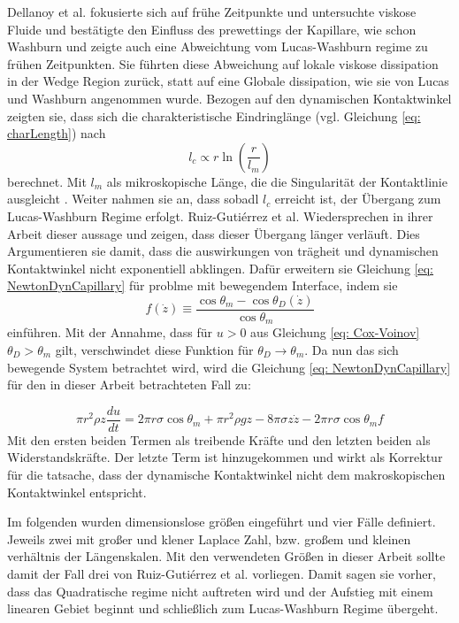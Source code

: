 Dellanoy et al. \cite{delannoy2019DualRoleViscosity} fokusierte sich auf frühe Zeitpunkte und untersuchte viskose Fluide und bestätigte den Einfluss des prewettings der Kapillare, wie schon Washburn \cite{washburn1921DynamicsCapillaryFlow} und zeigte auch eine Abweichtung vom Lucas-Washburn regime zu frühen Zeitpunkten. Sie führten diese Abweichung auf lokale viskose dissipation in der Wedge Region zurück, statt auf eine Globale dissipation, wie sie von Lucas und Washburn angenommen wurde. Bezogen auf den dynamischen Kontaktwinkel zeigten sie, dass sich die charakteristische Eindringlänge (vgl. Gleichung \ref{eq: charLength}) nach 
\begin{equation}
    l_c \propto r \ln\left(\frac{r}{l_m}\right)
\end{equation}
berechnet. Mit $l_m$ als mikroskopische Länge, die die Singularität der Kontaktlinie ausgleicht \cite{cox1986DynamicsSpreadingLiquids}. Weiter nahmen sie an, dass sobadl $l_c$ erreicht ist, der Übergang zum Lucas-Washburn Regime erfolgt.
Ruiz-Gutiérrez et al. \cite{ruiz-gutierrez2022LongCrossoverDynamics} Wiedersprechen in ihrer Arbeit dieser aussage und zeigen, dass dieser Übergang länger verläuft. Dies Argumentieren sie damit, dass die auswirkungen von trägheit und dynamischen Kontaktwinkel nicht exponentiell abklingen. 
Dafür erweitern sie Gleichung \ref{eq: NewtonDynCapillary} für problme mit bewegendem Interface, indem sie 
\begin{equation}
    f(\dot{z}) \equiv \frac{\cos\theta_{m}-\cos\theta_D(\dot{z})}{\cos\theta_m} 
\end{equation}
einführen. Mit der Annahme, dass für $u>0$ aus Gleichung \ref{eq: Cox-Voinov} $\theta_D > \theta_m$ gilt, verschwindet diese Funktion für $\theta_D \rightarrow \theta_m$. 
Da nun das sich bewegende System betrachtet wird, wird die Gleichung \ref{eq: NewtonDynCapillary} für den in dieser Arbeit betrachteten Fall zu:

\begin{equation}
    \pi r^{2}\rho z \frac{du}{dt}= 2\pi r\sigma \cos\theta_{m}+\pi r^{2}\rho gz-8\pi \sigma z \dot{z} -2\pi r \sigma \cos \theta_{m}f
\end{equation}
Mit den ersten beiden Termen als treibende Kräfte und den letzten beiden als Widerstandskräfte. Der letzte Term ist hinzugekommen und wirkt als Korrektur für die tatsache, dass der dynamische Kontaktwinkel nicht dem makroskopischen Kontaktwinkel entspricht.

Im folgenden wurden dimensionslose größen eingeführt und vier Fälle definiert. Jeweils zwei mit großer und klener Laplace Zahl, bzw. großem und kleinen verhältnis der Längenskalen. Mit den verwendeten Größen in dieser Arbeit sollte damit der Fall drei von Ruiz-Gutiérrez et al. \cite{ruiz-gutierrez2022LongCrossoverDynamics} vorliegen. Damit sagen sie vorher, dass das Quadratische regime nicht auftreten wird und der Aufstieg mit einem linearen Gebiet beginnt und schließlich zum Lucas-Washburn Regime übergeht.






